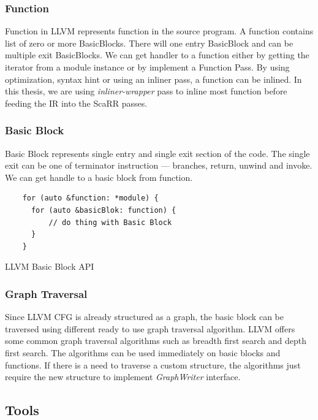 \subsubsection{Function}

Function in LLVM represents function in the source program. A function contains list of zero or more BasicBlocks. There will one entry BasicBlock and can be multiple exit BasicBlocks. We can get handler to a function either by getting the iterator from a module instance or by implement a Function Pass. By using optimization, syntax hint or using an inliner pass, a function can be inlined. In this thesis, we are using \emph{inliner-wrapper} pass to inline most function before feeding the IR into the ScaRR passes.

\subsubsection{Basic Block}

Basic Block represents single entry and single exit section of the code. The single exit can be one of terminator instruction — branches, return, unwind and invoke. We can get handle to a basic block from function. 

\begin{listing}
\begin{verbatim}
    for (auto &function: *module) {
      for (auto &basicBlok: function) {
          // do thing with Basic Block
      }
    }
\end{verbatim}
\caption{LLVM Basic Block API}    
\label{listing:2-6}
\end{listing}

\subsubsection{Graph Traversal}

Since LLVM CFG is already structured as a graph, the basic block can be traversed using different ready to use graph traversal algorithm. LLVM offers some common graph traversal algorithms such as breadth first search and depth first search. The algorithms can be used immediately on basic blocks and functions. If there is a need to traverse a custom structure, the algorithms just require the new structure to implement \emph{GraphWriter} interface.

\subsection{Tools}

